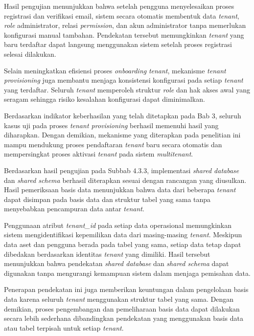 Hasil pengujian menunjukkan bahwa setelah pengguna menyelesaikan proses registrasi dan verifikasi email, sistem secara otomatis membentuk data \textit{tenant}, \textit{role} administrator, relasi \textit{permission}, dan akun administrator tanpa memerlukan konfigurasi manual tambahan. Pendekatan tersebut memungkinkan \textit{tenant} yang baru terdaftar dapat langsung menggunakan sistem setelah proses registrasi selesai dilakukan.

Selain meningkatkan efisiensi proses \textit{onboarding} \textit{tenant}, mekanisme \textit{tenant provisioning} juga membantu menjaga konsistensi konfigurasi pada setiap \textit{tenant} yang terdaftar. Seluruh \textit{tenant} memperoleh struktur \textit{role} dan hak akses awal yang seragam sehingga risiko kesalahan konfigurasi dapat diminimalkan.

Berdasarkan indikator keberhasilan yang telah ditetapkan pada Bab 3, seluruh kasus uji pada proses \textit{tenant provisioning} berhasil memenuhi hasil yang diharapkan. Dengan demikian, mekanisme yang diterapkan pada penelitian ini mampu mendukung proses pendaftaran \textit{tenant} baru secara otomatis dan mempersingkat proses aktivasi \textit{tenant} pada sistem \textit{multitenant}.

Berdasarkan hasil pengujian pada Subbab 4.3.3, implementasi \textit{shared database} dan \textit{shared schema} berhasil diterapkan sesuai dengan rancangan yang diusulkan. Hasil pemeriksaan basis data menunjukkan bahwa data dari beberapa \textit{tenant} dapat disimpan pada basis data dan struktur tabel yang sama tanpa menyebabkan pencampuran data antar \textit{tenant}.

Penggunaan atribut \textit{tenant\_id} pada setiap data operasional memungkinkan sistem mengidentifikasi kepemilikan data dari masing-masing \textit{tenant}. Meskipun data aset dan pengguna berada pada tabel yang sama, setiap data tetap dapat dibedakan berdasarkan identitas \textit{tenant} yang dimiliki. Hasil tersebut menunjukkan bahwa pendekatan \textit{shared database} dan \textit{shared schema} dapat digunakan tanpa mengurangi kemampuan sistem dalam menjaga pemisahan data.

Penerapan pendekatan ini juga memberikan keuntungan dalam pengelolaan basis data karena seluruh \textit{tenant} menggunakan struktur tabel yang sama. Dengan demikian, proses pengembangan dan pemeliharaan basis data dapat dilakukan secara lebih sederhana dibandingkan pendekatan yang menggunakan basis data atau tabel terpisah untuk setiap \textit{tenant}.

